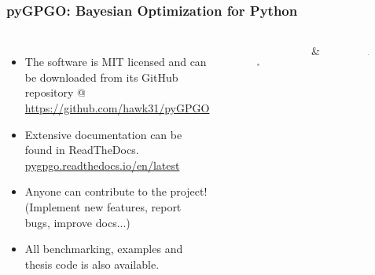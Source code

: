 \documentclass[10pt,usenames,dvipsnames]{beamer}
\begin{document}
\begin{frame}
\frametitle{pyGPGO: Bayesian Optimization for Python}
\begin{columns}
\centering
\begin{itemize}
\item The software is MIT licensed and can be downloaded from its GitHub repository @ \textcolor{blue}{\url{https://github.com/hawk31/pyGPGO}}
\item Extensive documentation can be found in ReadTheDocs. \textcolor{blue}{\url{pygpgo.readthedocs.io/en/latest}}
\item Anyone can contribute to the project! (Implement new features, report bugs, improve docs...)
\item All benchmarking, examples and thesis code is also available. 
\end{itemize}
\begin{figure}
\includegraphics[width=0.4\textwidth]{figures/github}\\
\end{figure}
\centering
\Large \&
\begin{figure}
\includegraphics[width=0.3\textwidth]{figures/read}
\end{figure}
\end{columns}
\end{frame}
\end{document}
